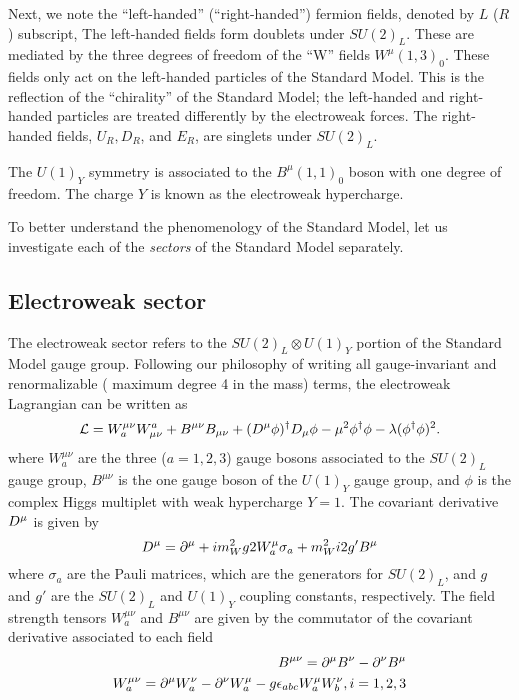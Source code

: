 Next, we note the ``left-handed'' (``right-handed'') fermion fields, denoted by $L$ ($R$) subscript,
The left-handed fields form doublets under $SU(2)_L$.
These are mediated by the three degrees of freedom of the  ``W'' fields $W^\mu(1,3)_0$.
These fields only act on the left-handed particles of the Standard Model.
This is the reflection of the ``chirality'' of the Standard Model; the left-handed and right-handed particles are treated differently by the electroweak forces.
The right-handed fields, $U_R, D_R$, and $E_R$, are singlets under $SU(2)_L$.

The $U(1)_Y$ symmetry is associated to the $B^\mu(1,1)_0$ boson with one degree of freedom.
The charge $Y$ is known as the electroweak hypercharge.

To better understand the phenomenology of the Standard Model, let us investigate each of the \textit{sectors} of the Standard Model separately.

\subsection{Electroweak sector}

The electroweak sector refers to the $SU(2)_L \otimes U(1)_Y$ portion of the Standard Model gauge group.
Following our philosophy of writing all gauge-invariant and renormalizable ( maximum degree 4 in the mass) terms, the electroweak Lagrangian can be written as
\begin{equation}
\mathcal{L} =  W^{\mu\nu}_a W_{\mu\nu}^a + B^{\mu\nu} B_{\mu\nu} + (D^\mu \phi)^\dagger D_\mu \phi -  \mu^2 \phi^\dagger \phi - \lambda (\phi^\dagger \phi)^2.
\end{equation}
where $W^{\mu\nu}_a$ are the three ($a=1,2,3$) gauge bosons associated to the $SU(2)_L$ gauge group, $B^{\mu\nu}$ is the one gauge boson of the $U(1)_Y$ gauge group, and $\phi$ is the complex Higgs multiplet with weak hypercharge $Y = 1$.
The covariant derivative $D^\mu$ is given by
\begin{equation}
D^\mu = \partial^\mu  + i m_W^2{g}{2} W^\mu_a \sigma_a + m_W^2{i}{2} g' B^\mu
\end{equation}
where $\sigma_a$ are the Pauli matrices, which are the generators for $SU(2)_L$, and $g$ and $g'$ are the $SU(2)_L$ and $U(1)_Y$ coupling constants, respectively.
The field strength tensors  $W^{\mu\nu}_a$ and $B^{\mu\nu}$ are given by the commutator of the covariant derivative associated to each field
\begin{equation} \label{eq:ew_field_strength_tensor}
\begin{aligned}
B^{\mu\nu}   = \partial^\mu B^\nu - \partial^\nu B^\mu \\
W^{\mu\nu}_a = \partial^\mu W^\nu_a - \partial^\nu W^\mu_a - g \epsilon_{abc} W^\mu_a W^\nu_b, i = 1,2,3
\end{aligned}
\end{equation}

